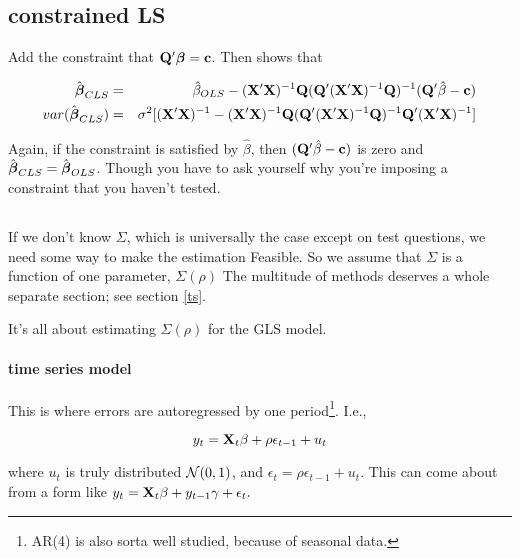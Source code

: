 \subsection{constrained LS }

Add the constraint that ${\bf Q}'{\mbox{\boldmath$\beta$}}={\bf c}$. Then \cite{amemiya:ez}
shows that 

\begin{eqnarray}
\hat{{\mbox{\boldmath$\beta$}}}_{CLS} &=& \hat\beta_{OLS}-
({\bf X}'{\bf X})^{-1}{\bf Q}({\bf Q}'({\bf X}'{\bf X})^{-1}{\bf Q})^{-1}
		({\bf Q}'\hat\beta-{\bf c})			\nonumber\\
var(\hat{{\mbox{\boldmath$\beta$}}}_{CLS}) &=& \sigma^2[({\bf X}'{\bf X})^{-1} - 		
({\bf X}'{\bf X})^{-1}{\bf Q}({\bf Q}'({\bf X}'{\bf X})^{-1}{\bf Q})^{-1}{\bf Q}'({\bf X}'{\bf X})^{-1}]
\nonumber
\end{eqnarray}

Again, if the constraint is satisfied by $\hat\beta$, then
$({\bf Q}'\hat\beta-{\bf c})$ is zero and $\hat{{\mbox{\boldmath$\beta$}}}_{CLS}=\hat{{\mbox{\boldmath$\beta$}}}_{OLS}$.
Though you have to ask yourself why you're imposing a constraint that
you haven't tested.



\subsection{}

If we don't know $\Sigma$, which is universally the case except on
test questions, we need some way to make the estimation Feasible. So we
assume that $\Sigma$ is a function of one parameter, $\Sigma(\rho)$ The
multitude of methods deserves a whole separate section; see section \ref{ts}.

\label{ts}

It's all about estimating $\Sigma(\rho)$ for the GLS model. 

\paragraph{ time series model}

This is where errors are autoregressed by one period\footnote{AR(4) is
also sorta well studied, because of seasonal data.}. I.e.,

$$y_t={\bf X}_t\beta + \rho\epsilon_{t-1} + u_t$$

where $u_t$ is truly distributed ${\cal N}(0,1)$, and $\epsilon_t=
\rho\epsilon_{t-1} + u_t$. This can come about from  a form like
$y_t={\bf X}_t\beta + y_{t-1}\gamma + \epsilon_t.$


